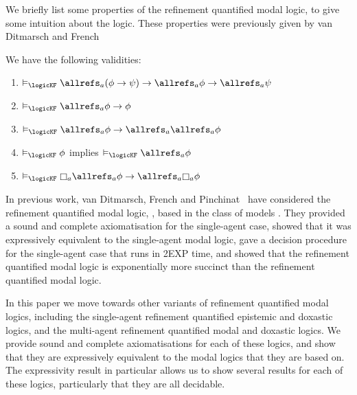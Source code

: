 We briefly list some properties of the refinement quantified modal logic, to
give some intuition about the logic. These properties were previously given by
van Ditmarsch and French~\cite{french2009simulation}

\begin{proposition}
We have the following validities: 
\begin{enumerate}
\item $\entails_{\logicKF} \allrefs_a (\phi \implies \psi) \implies \allrefs_a
\phi \implies \allrefs_a \psi$
\item $\entails_{\logicKF} \allrefs_a \phi \implies \phi$
\item $\entails_{\logicKF} \allrefs_a \phi \implies \allrefs_a \allrefs_a \phi$
\item $\entails_{\logicKF} \phi$ implies $\entails_{\logicKF} \allrefs_a \phi$
\item $\entails_{\logicKF} \knows_a \allrefs_a \phi \implies \allrefs_a \knows_a
\phi$
\end{enumerate}
\end{proposition}

In previous work, van Ditmarsch, French and Pinchinat~\cite{french2010future}
have considered the refinement quantified modal logic, \logicKF{}, based in the
class of models \classK{}. They provided a sound and complete axiomatisation for
the single-agent case, showed that it was expressively equivalent to the
single-agent modal logic, gave a decision procedure for the single-agent case
that runs in 2EXP time, and showed that the refinement quantified modal logic is
exponentially more succinct than the refinement quantified modal logic.

In this paper we move towards other variants of refinement quantified modal
logics, including the single-agent refinement quantified epistemic and doxastic
logics, and the multi-agent refinement quantified modal and doxastic logics. We
provide sound and complete axiomatisations for each of these logics, and show
that they are expressively equivalent to the modal logics that they are based
on. The expressivity result in particular allows us to show several results for
each of these logics, particularly that they are all decidable.
